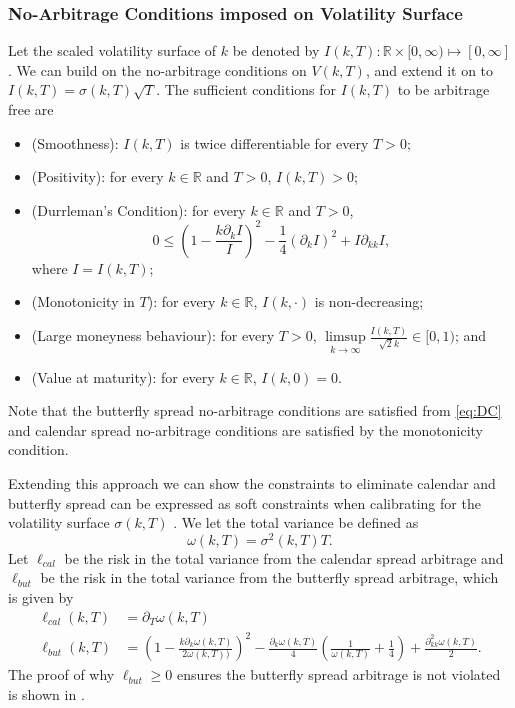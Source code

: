 \documentclass{article}
\theoremstyle{plain}%
\theoremstyle{definition}
\theoremstyle{remark}
\begin{document}
\subsubsection{No-Arbitrage Conditions imposed on Volatility Surface}
Let the scaled volatility surface of $k$ be denoted by $I(k,T):\mathbb{R}\times[0,\infty)\mapsto[0,\infty]$. We can build on the no-arbitrage conditions on $V(k,T)$, and extend it on to $I(k,T) = \sigma(k,T)\sqrt{T}$. The sufficient conditions for $I(k,T)$ to be arbitrage free are \citep{roper-2010}
\begin{itemize}
    \item (Smoothness): $I(k,T)$ is twice differentiable for every $T>0$;
    \item (Positivity): for every $k\in\mathbb{R}$ and $T>0$, $I(k,T) > 0$;
    \item (Durrleman's Condition): for every $k\in\mathbb{R}$ and $T>0$, 
        \begin{equation}
            0\leq (1 - \frac{k\partial_kI}{I})^2-\frac{1}{4}(\partial_kI)^2+I\partial_{kk}I,
            \label{eq:DC}
        \end{equation}
        where $I = I(k,T)$;
    \item (Monotonicity in $T$): for every $k\in\mathbb{R}$, $I(k,\cdot)$ is non-decreasing;
    \item (Large moneyness behaviour): for every $T>0$, $\limsup\limits_{k\rightarrow \infty}\frac{I(k,T)}{\sqrt{2}k}\in[0,1)$; and 
    \item (Value at maturity): for every $k\in\mathbb{R}$, $I(k,0) = 0$.
\end{itemize}
Note that the butterfly spread no-arbitrage conditions are satisfied from \eqref{eq:DC} and calendar spread no-arbitrage conditions are satisfied by the monotonicity condition.

Extending this approach we can show the constraints to eliminate calendar and butterfly spread can be expressed as soft constraints when calibrating for the volatility surface $\sigma(k,T)$ \citep{ackerer-2020}. We let the total variance be defined as
\[
\omega(k, T) =\sigma^2(k,T) T.
\]
Let $\ell_{cal}$ be the risk in the total variance from the calendar spread arbitrage and $\ell_{but}$ be the risk in the total variance from the butterfly spread arbitrage, which is given by
\begin{align*}
\ell_{cal}(k,T) &=\partial_T \omega(k,T) \\
\ell_{but}(k,T) &= \left( 1- \frac{k \partial_k \omega (k,T)}{2 \omega(k,T))}\right)^2 -\frac{\partial_k \omega(k,T)}{4} \left( \frac{1}{\omega(k,T)}+\frac{1}{4} \right)+ \frac{\partial^2_{kk} \omega(k,T)}{2}.
\end{align*}The proof of why $\ell_{but} \geq 0$ ensures the butterfly spread arbitrage is not violated  is shown in \citep{gatheral-2014}.
\end{document}
